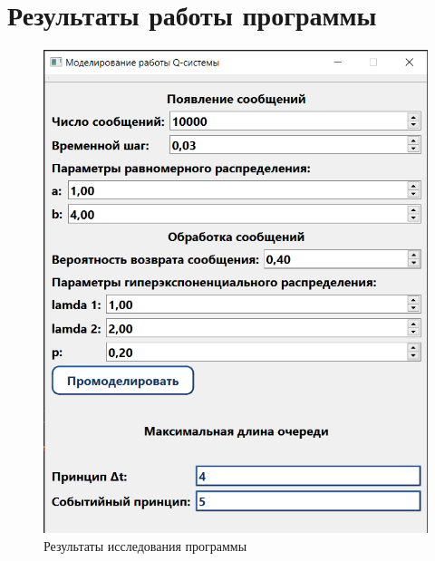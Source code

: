 \documentclass[14pt, a4paper]{extarticle}
\begin{document}
\section{Результаты работы программы}



\begin{figure}[h]
	\begin{center}
		{\includegraphics[scale=0.85]{pictures/1.png}
			\caption{Результаты исследования программы}
			\label{pic:1}}
	\end{center}
\end{figure}
\end{document}
